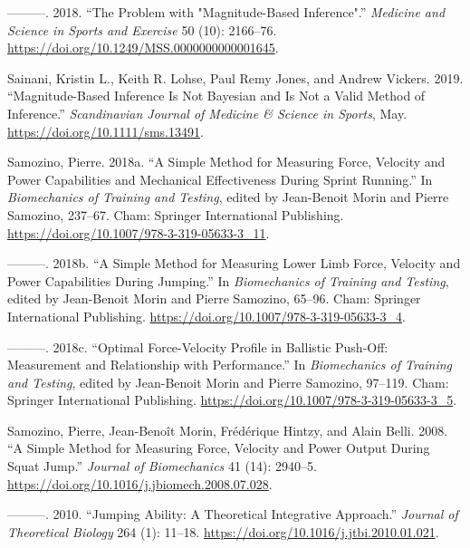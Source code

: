 \documentclass[
]{book}
\newlength{\cslhangindent}
\newenvironment{cslreferences}%
  {\setlength{\parindent}{0pt}%
  \everypar{\setlength{\hangindent}{\cslhangindent}}\ignorespaces}%
  {\par}
\begin{document}
\begin{cslreferences}
\leavevmode\hypertarget{ref-sainaniProblemMagnitudebasedInference2018}{}%
---------. 2018. ``The Problem with "Magnitude-Based Inference".'' \emph{Medicine and Science in Sports and Exercise} 50 (10): 2166--76. \url{https://doi.org/10.1249/MSS.0000000000001645}.

\leavevmode\hypertarget{ref-sainaniMagnitudeBasedInference2019}{}%
Sainani, Kristin L., Keith R. Lohse, Paul Remy Jones, and Andrew Vickers. 2019. ``Magnitude-Based Inference Is Not Bayesian and Is Not a Valid Method of Inference.'' \emph{Scandinavian Journal of Medicine \& Science in Sports}, May. \url{https://doi.org/10.1111/sms.13491}.

\leavevmode\hypertarget{ref-samozinoSimpleMethodMeasuring2018a}{}%
Samozino, Pierre. 2018a. ``A Simple Method for Measuring Force, Velocity and Power Capabilities and Mechanical Effectiveness During Sprint Running.'' In \emph{Biomechanics of Training and Testing}, edited by Jean-Benoit Morin and Pierre Samozino, 237--67. Cham: Springer International Publishing. \url{https://doi.org/10.1007/978-3-319-05633-3_11}.

\leavevmode\hypertarget{ref-samozinoSimpleMethodMeasuring2018}{}%
---------. 2018b. ``A Simple Method for Measuring Lower Limb Force, Velocity and Power Capabilities During Jumping.'' In \emph{Biomechanics of Training and Testing}, edited by Jean-Benoit Morin and Pierre Samozino, 65--96. Cham: Springer International Publishing. \url{https://doi.org/10.1007/978-3-319-05633-3_4}.

\leavevmode\hypertarget{ref-samozinoOptimalForceVelocityProfile2018}{}%
---------. 2018c. ``Optimal Force-Velocity Profile in Ballistic Push-Off: Measurement and Relationship with Performance.'' In \emph{Biomechanics of Training and Testing}, edited by Jean-Benoit Morin and Pierre Samozino, 97--119. Cham: Springer International Publishing. \url{https://doi.org/10.1007/978-3-319-05633-3_5}.

\leavevmode\hypertarget{ref-samozinoSimpleMethodMeasuring2008}{}%
Samozino, Pierre, Jean-Benoît Morin, Frédérique Hintzy, and Alain Belli. 2008. ``A Simple Method for Measuring Force, Velocity and Power Output During Squat Jump.'' \emph{Journal of Biomechanics} 41 (14): 2940--5. \url{https://doi.org/10.1016/j.jbiomech.2008.07.028}.

\leavevmode\hypertarget{ref-samozinoJumpingAbilityTheoretical2010}{}%
---------. 2010. ``Jumping Ability: A Theoretical Integrative Approach.'' \emph{Journal of Theoretical Biology} 264 (1): 11--18. \url{https://doi.org/10.1016/j.jtbi.2010.01.021}.


\end{cslreferences}
\end{document}
